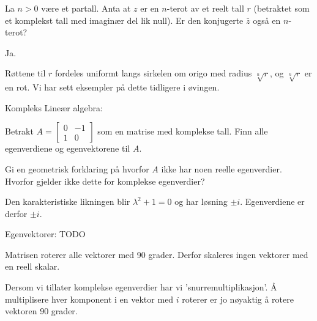 \begin{oppgave}
La $n>0$ være et partall. Anta at $z$ er en $n$-terot av et reelt tall $r$ (betraktet som et komplekst tall med imaginær del lik null). Er den konjugerte $\bar{z}$ også en $n$-terot?
\end{oppgave}

\begin{losning}
Ja.

\noindent
Røttene til $r$ fordeles uniformt langs sirkelen om origo med radius $\sqrt[n]{r}$, og $\sqrt[n]{r}$ er en rot. Vi har sett eksempler på dette tidligere i øvingen.
\end{losning}


Kompleks Lineær algebra:

\begin{oppgave}
\begin{punkt}
Betrakt $A=\begin{bmatrix}
0 & -1\\
1 & 0
\end{bmatrix}$ som en matrise med komplekse tall. Finn alle egenverdiene og egenvektorene til $A$.
\end{punkt}

\begin{punkt}
Gi en geometrisk forklaring på hvorfor $A$ ikke har noen reelle egenverdier. Hvorfor gjelder ikke dette for komplekse egenverdier?
\end{punkt}

\end{oppgave}

\begin{losning}

\begin{punkt}
Den karakteristiske likningen blir $\lambda^2+1=0$ og har løsning $\pm i$. Egenverdiene er derfor $\pm i$.

Egenvektorer: TODO

\end{punkt}

\begin{punkt}
Matrisen roterer alle vektorer med 90 grader. Derfor skaleres ingen vektorer med en reell skalar.

\noindent
Dersom vi tillater komplekse egenverdier har vi 'snurremultiplikasjon'. Å multiplisere hver komponent i en vektor med $i$ roterer er jo nøyaktig å rotere vektoren 90 grader.
\end{punkt}
\end{losning}

